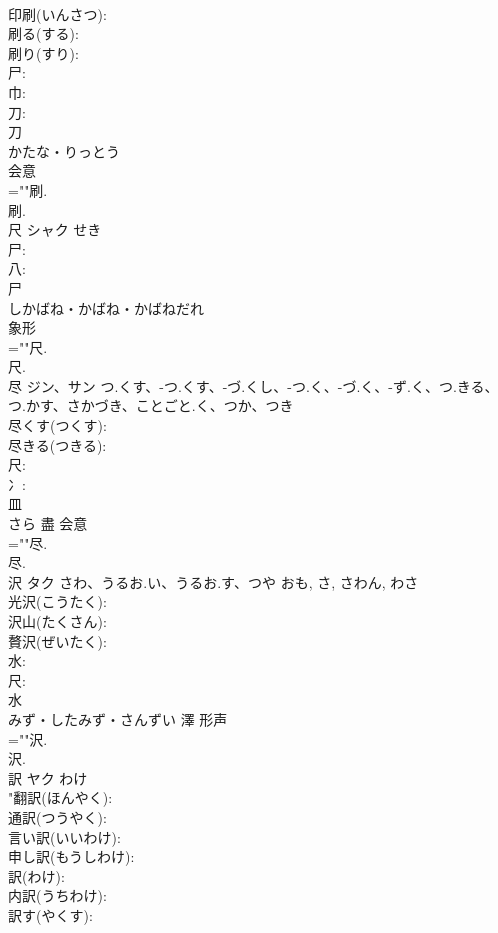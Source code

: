 \documentclass[8pt]{extreport}
\begin{document}
\begin{CJK}{UTF8}{min}
\\	印刷(いんさつ): 
\\	刷る(する): 
\\	刷り(すり): 
\\	尸: 
\\	巾: 
\\	刀: 
\\	刀	
\\	かたな・りっとう	
\\	会意 
\\	=""刷.
\\	刷.
\\	尺	シャク		せき	
\\	尸: 
\\	八: 
\\	尸	
\\	しかばね・かばね・かばねだれ	
\\	象形 
\\	=""尺.
\\	尺.
\\	尽	ジン、サン	つ.くす、-つ.くす、-づ.くし、-つ.く、-づ.く、-ず.く、つ.きる、つ.かす、さかづき、ことごと.く、つか、つき		
\\	尽くす(つくす): 
\\	尽きる(つきる): 
\\	尺: 
\\	冫: 
\\	皿	
\\	さら	盡	会意 
\\	=""尽.
\\	尽.
\\	沢	タク	さわ、うるお.い、うるお.す、つや	おも, さ, さわん, わさ	
\\	光沢(こうたく): 
\\	沢山(たくさん): 
\\	贅沢(ぜいたく): 
\\	水: 
\\	尺: 
\\	水	
\\	みず・したみず・さんずい	澤	形声 
\\	=""沢.
\\	沢.
\\	訳	ヤク	わけ		
\\	"翻訳(ほんやく): 
\\	通訳(つうやく): 
\\	言い訳(いいわけ): 
\\	申し訳(もうしわけ): 
\\	訳(わけ): 
\\	内訳(うちわけ): 
\\	訳す(やくす): 

\end{CJK}
\end{document}
